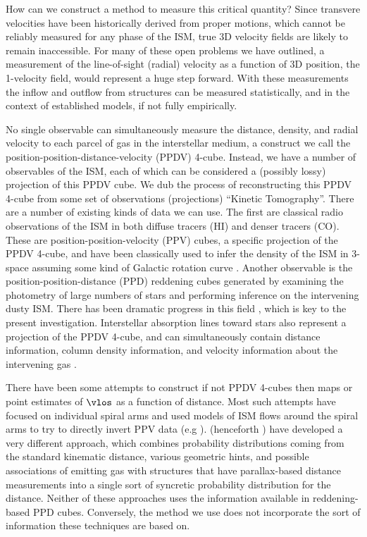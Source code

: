 How can we construct a method to measure this critical quantity? Since transvere velocities have been historically derived from proper motions, which cannot be reliably measured for any phase of the ISM, true 3D velocity fields are likely to remain inaccessible. 
For many of these open problems we have outlined, a measurement of the line-of-sight (radial) velocity as a function of 3D position, the 1-velocity field, would represent a huge step forward. With these measurements the inflow and outflow from structures can be measured statistically, and in the context of established models, if not fully empirically. 

No single observable can simultaneously measure the distance, density, and radial velocity to each parcel of gas in the interstellar medium, a construct we call the position-position-distance-velocity (PPDV) 4-cube. Instead, we have a number of observables of the ISM, each of which can be considered a (possibly lossy) projection of this PPDV cube. We dub the process of reconstructing this PPDV 4-cube from some set of observations (projections) ``Kinetic Tomography''. There are a number of existing kinds of data we can use. The first are classical radio observations of the ISM in both diffuse tracers (HI) and denser tracers (CO). These are position-position-velocity (PPV) cubes, a specific projection of the PPDV 4-cube, and have been classically used to infer the density of the ISM in 3-space assuming some kind of Galactic rotation curve \citep[e.g.][]{Levine_2006}. Another observable is the position-position-distance (PPD) reddening cubes generated by examining the photometry of large numbers of stars and performing inference on the intervening dusty ISM. There has been dramatic progress in this field \cite{Marshall_2006,Lallement_2014,Green_2015}, which is key to the present investigation. Interstellar absorption lines toward stars also represent a projection of the PPDV 4-cube, and can simultaneously contain distance information, column density information, and velocity information about the intervening gas \cite{Welsh10,Zasowski_2014,2015MmSAI..86..521Z}.

There have been some attempts to construct if not PPDV 4-cubes then maps or point estimates of $\vlos$ as a function of distance. 
Most such attempts have focused on individual spiral arms and used models of ISM flows around the spiral arms to try to directly invert PPV data (e.g  \citealt{1972A&A....16..118S,Foster_2006}).
\citet{Reid_2016} (henceforth \Reid{}) have developed a very different approach, which combines probability distributions coming from the standard kinematic distance, various geometric hints, and possible associations of emitting gas with structures that have parallax-based distance measurements into a single sort of syncretic probability distribution for the distance. 
Neither of these approaches uses the information available in reddening-based PPD cubes. 
Conversely, the method we use does not incorporate the sort of information these techniques are based on.

